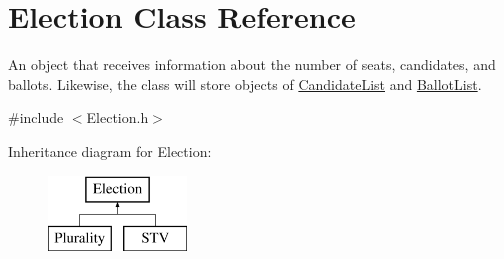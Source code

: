 \hypertarget{class_election}{}\section{Election Class Reference}
\label{class_election}


An object that receives information about the number of seats, candidates, and ballots. Likewise, the class will store objects of \hyperlink{class_candidate_list}{Candidate\+List} and \hyperlink{class_ballot_list}{Ballot\+List}.  




{\ttfamily \#include $<$Election.\+h$>$}

Inheritance diagram for Election\+:\begin{figure}[H]
\begin{center}
\leavevmode
\includegraphics[height=2.000000cm]{class_election}
\end{center}
\end{figure}

